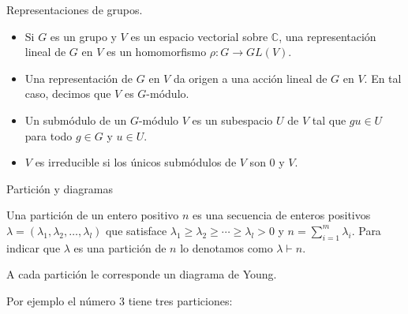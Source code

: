 \documentclass[final,xcolor=svgnames]{beamer}
\begin{document}
\begin{frame}{}
\begin{columns}
\begin{column}{0.5\textwidth}
      \begin{block}{Representaciones de grupos.}
        \begin{itemize}
          \item Si $G$ es un grupo y $V$ es un espacio vectorial sobre
            $\mathbb{C}$, una \alert{representación lineal} de $G$ en
            $V$ es un homomorfismo $\rho\colon G\rightarrow GL(V).$
          \item Una representación de $G$ en $V$ da origen a una
            acción lineal de $G$ en $V$. En tal caso, decimos que $V$ es \alert{$G$-módulo.}  
         \item Un \alert{submódulo} de un $G$-módulo $V$ es un
           subespacio $U$ de $V$ tal que $gu \in U$ para todo $g\in G$ y $u\in U$.
          \item $V$ es \alert{irreducible} si los únicos submódulos de
            $V$ son $0$ y $V$.
        \end{itemize}
      \end{block}

      \begin{block}{Partición y diagramas}
        \begin{minipage}{0.5\linewidth}
          Una \alert{partición} de un entero positivo $n$ es una secuencia de
          enteros positivos
          $\lambda=(\lambda_{1},\lambda_{2},\ldots,\lambda_{l})$ que satisface
          $\lambda_{1}\geq\lambda_{2}\geq\cdots\geq\lambda_{l}>0$ y
          $n=\sum^{m}_{i=1}\lambda_{i}$. Para indicar que  $\lambda$ es una partición de
          $n$ lo denotamos como $\lambda\vdash n$.

          A cada partición le corresponde un \alert{diagrama de Young}.
          
          Por ejemplo el número $3$ tiene tres particiones:


\end{minipage}
\end{block}
\end{column}
\end{columns}
\end{frame}
\end{document}
